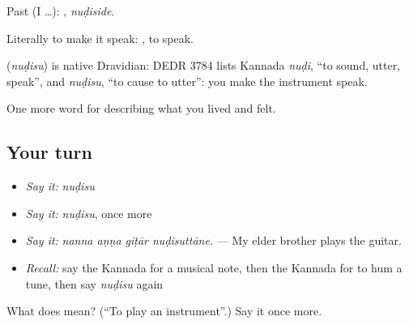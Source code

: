 Past (I …): , \emph{nuḍiside}.

Literally to make it speak: , to speak.

\begin{cousinweb}
\textbf{} (\emph{nuḍisu}) is native Dravidian: DEDR 3784 lists Kannada \emph{nuḍi}, \textquotedblleft{}to sound, utter, speak\textquotedblright{}, and \emph{nuḍisu}, \textquotedblleft{}to cause to utter\textquotedblright{}: you make the instrument speak.
\end{cousinweb}

\begin{grammarlens}[title={What you've built}]
One more word for describing what you lived and felt.
\end{grammarlens}

\subsection*{Your turn}
\begin{itemize}
\raggedright
  \item \emph{Say it:} \emph{nuḍisu}
  \item \emph{Say it:} \emph{nuḍisu}, once more
  \item \emph{Say it:} \emph{nanna aṇṇa giṭār nuḍisuttāne.} — My elder brother plays the guitar.
  \item \emph{Recall:} say the Kannada for a musical note, then the Kannada for to hum a tune, then say \emph{nuḍisu} again
\end{itemize}

\begin{tcolorbox}[breakable,colback=teal!4,colframe=teal!35!black,title={Before you move on}]
What does  mean? (\textquotedblleft{}To play an instrument\textquotedblright{}.) Say it once more.
\end{tcolorbox}
